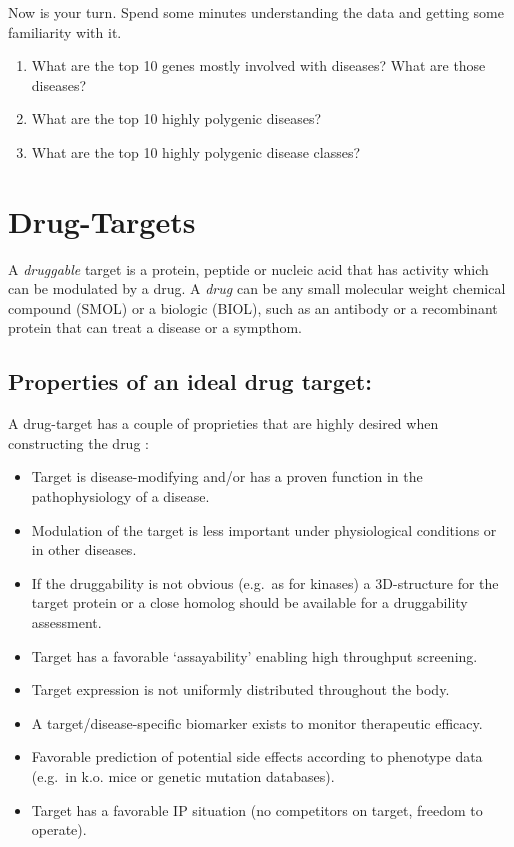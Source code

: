 \documentclass[
]{book}
\begin{document}
Now is your turn. Spend some minutes understanding the data and getting some familiarity with it.

\begin{enumerate}
\def\labelenumi{\arabic{enumi}.}
\item
  What are the top 10 genes mostly involved with diseases? What are those diseases?
\item
  What are the top 10 highly polygenic diseases?
\item
  What are the top 10 highly polygenic disease classes?
\end{enumerate}

\hypertarget{DTs}{%
\section{Drug-Targets}\label{DTs}}

A \emph{druggable} target is a protein, peptide or nucleic acid that has activity which can be modulated by a drug. A \emph{drug} can be any small molecular weight chemical compound (SMOL) or a biologic (BIOL), such as an antibody or a recombinant protein that can treat a disease or a sympthom.

\hypertarget{properties-of-an-ideal-drug-target}{%
\subsection{Properties of an ideal drug target:}\label{properties-of-an-ideal-drug-target}}

A drug-target has a couple of proprieties that are highly desired when constructing the drug \citep{Gashaw2011}:

\begin{itemize}
\item
  Target is disease-modifying and/or has a proven function in the pathophysiology of a disease.
\item
  Modulation of the target is less important under physiological conditions or in other diseases.
\item
  If the druggability is not obvious (e.g.~as for kinases) a 3D-structure for the target protein or a close homolog should be available for a druggability assessment.
\item
  Target has a favorable `assayability' enabling high throughput screening.
\item
  Target expression is not uniformly distributed throughout the body.
\item
  A target/disease-specific biomarker exists to monitor therapeutic efficacy.
\item
  Favorable prediction of potential side effects according to phenotype data (e.g.~in k.o. mice or genetic mutation databases).
\item
  Target has a favorable IP situation (no competitors on target, freedom to operate).
\end{itemize}
\end{document}
